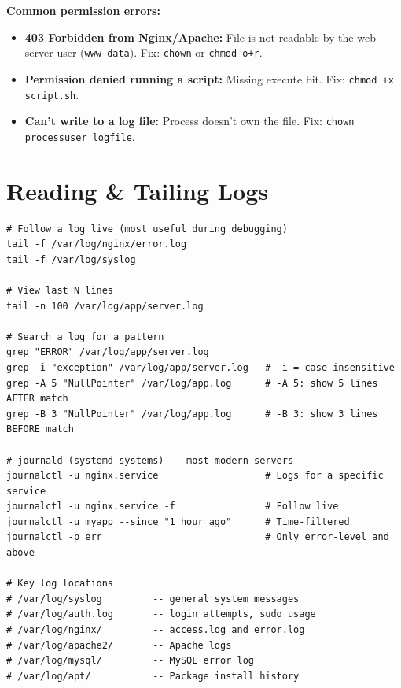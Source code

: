 \documentclass[11pt, letterpaper]{article}
\begin{document}
\begin{tcolorbox}[colback=notebg, colframe=noteborder, arc=3pt, boxrule=1pt]
\textbf{Common permission errors:}
\begin{itemize}[noitemsep, leftmargin=*]
  \item \textbf{403 Forbidden from Nginx/Apache:} File is not readable by the web server user (\texttt{www-data}). Fix: \texttt{chown} or \texttt{chmod o+r}.
  \item \textbf{Permission denied running a script:} Missing execute bit. Fix: \texttt{chmod +x script.sh}.
  \item \textbf{Can't write to a log file:} Process doesn't own the file. Fix: \texttt{chown processuser logfile}.
\end{itemize}
\end{tcolorbox}

\section*{Reading \& Tailing Logs}

\begin{lstlisting}[style=shell, caption={Log reading commands}]
# Follow a log live (most useful during debugging)
tail -f /var/log/nginx/error.log
tail -f /var/log/syslog

# View last N lines
tail -n 100 /var/log/app/server.log

# Search a log for a pattern
grep "ERROR" /var/log/app/server.log
grep -i "exception" /var/log/app/server.log   # -i = case insensitive
grep -A 5 "NullPointer" /var/log/app.log      # -A 5: show 5 lines AFTER match
grep -B 3 "NullPointer" /var/log/app.log      # -B 3: show 3 lines BEFORE match

# journald (systemd systems) -- most modern servers
journalctl -u nginx.service                   # Logs for a specific service
journalctl -u nginx.service -f                # Follow live
journalctl -u myapp --since "1 hour ago"      # Time-filtered
journalctl -p err                             # Only error-level and above

# Key log locations
# /var/log/syslog         -- general system messages
# /var/log/auth.log       -- login attempts, sudo usage
# /var/log/nginx/         -- access.log and error.log
# /var/log/apache2/       -- Apache logs
# /var/log/mysql/         -- MySQL error log
# /var/log/apt/           -- Package install history
\end{lstlisting}
\end{document}
